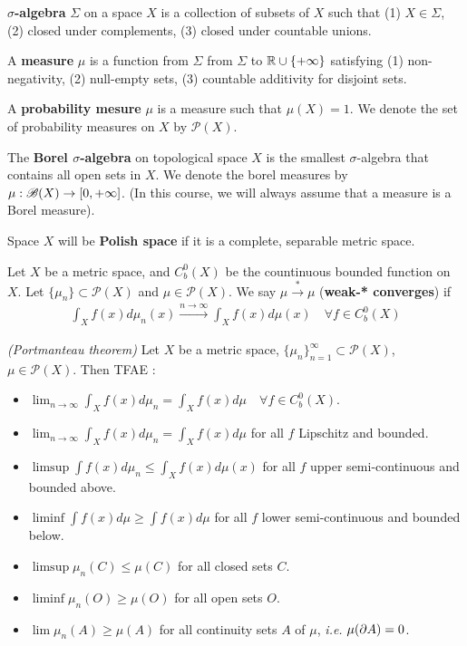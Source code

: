 \documentclass[12pt,a4paper]{article}
\renewenvironment{i}
{\begin{itemize} 
	}%
	{\end{itemize}
}
\begin{document}
 \textbf{$\sigma$-algebra} $\Sigma$ on a space $X$ is a collection of subsets of $X$ such that (1) $X\in \Sigma$, (2) closed under complements, (3) closed under countable unions.

\quad A \textbf{measure} $\mu$ is a function from $\Sigma$ from $\Sigma$ to $\mathbb{R} \cup \{+ \infty\}$ satisfying (1) non-negativity, (2) null-empty sets, (3) countable additivity for disjoint sets.

\quad A \textbf{probability mesure} $\mu$ is a measure such that $\mu(X)=1$. We denote the set of probability measures on $X$ by $\mathscr{P}(X)$.

\quad The \textbf{Borel $\sigma$-algebra} on topological space $X$ is the smallest $\sigma$-algebra that contains all open sets in $X$. We denote the borel measures by $\mu : \mathscr{B}(X) \rightarrow [0, +\infty]$. (In this course, we will always assume that a measure is a Borel measure).

\quad Space $X$ will be \textbf{Polish space} if it is a complete, separable metric space.
\s

 Let $X$ be a metric space, and $C_b^0(X)$ be the countinuous bounded function on $X$. Let $\{\mu_n\} \subset \mathscr{P}(X)$ and $\mu\in \mathscr{P}(X)$. We say $\mu \xrightarrow{*} \mu$ (\textbf{weak-* converges}) if
\begin{align*}
\int_X f(x) d\mu_n(x) \xrightarrow{n\rightarrow \infty} \int_X f(x) d\mu(x) \quad \forall f\in C_b^0(X)
\end{align*}
\s

 \emph{(Portmanteau theorem)} Let $X$ be a metric space, $\{\mu_n\}_{n=1}^{\infty} \subset \mathscr{P}(X)$, $\mu \in \mathscr{P}(X)$. Then TFAE :
\begin{i}
\item $\lim_{n\rightarrow \infty} \int_X f(x) d\mu_n =\int_X f(x) d\mu \quad \forall f\in C_b^0(X)$.
\item $\lim_{n\rightarrow \infty} \int_X f(x) d\mu_n =\int_X f(x) d\mu$ for all $f$ Lipschitz and bounded.
\item $\limsup \int f(x) d\mu_n \leq \int_X f(x) d\mu(x)$ for all $f$ upper semi-continuous and bounded above.
\item $\liminf \int f(x) d\mu \geq \int f(x) d\mu$ for all $f$ lower semi-continuous and bounded below.
\item $\limsup \mu_n(C) \leq \mu(C)$ for all closed sets $C$.
\item $\liminf \mu_n(O) \geq \mu(O)$ for all open sets $O$.
\item $\lim \mu_n(A) \geq \mu(A)$ for all continuity sets $A$ of $\mu$, \textit{i.e.} $\mu(\partial A) =0$.
\end{i}
\s
\end{document}
